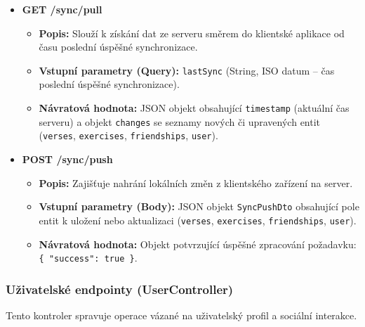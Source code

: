 \documentclass[12pt, a4paper, oneside]{article}
\begin{document}
	\begin{itemize}
		\item \textbf{GET /sync/pull}
		\begin{itemize}
			\item \textbf{Popis:} Slouží k získání dat ze serveru směrem do klientské aplikace od času poslední úspěšné synchronizace.
			\item \textbf{Vstupní parametry (Query):} \texttt{lastSync} (String, ISO datum – čas poslední úspěšné synchronizace).
			\item \textbf{Návratová hodnota:} JSON objekt obsahující \texttt{timestamp} (aktuální čas serveru) a objekt \texttt{changes} se seznamy nových či upravených entit (\texttt{verses}, \texttt{exercises}, \texttt{friendships}, \texttt{user}).
		\end{itemize}
		
		\item \textbf{POST /sync/push}
		\begin{itemize}
			\item \textbf{Popis:} Zajišťuje nahrání lokálních změn z klientského zařízení na server.
			\item \textbf{Vstupní parametry (Body):} JSON objekt \texttt{SyncPushDto} obsahující pole entit k uložení nebo aktualizaci (\texttt{verses}, \texttt{exercises}, \texttt{friendships}, \texttt{user}).
			\item \textbf{Návratová hodnota:} Objekt potvrzující úspěšné zpracování požadavku: \texttt{\{ "success": true \}}.
		\end{itemize}
	\end{itemize}
	
	\subsubsection{Uživatelské endpointy (UserController)}
	Tento kontroler spravuje operace vázané na uživatelský profil a sociální interakce.
	
\end{document}
